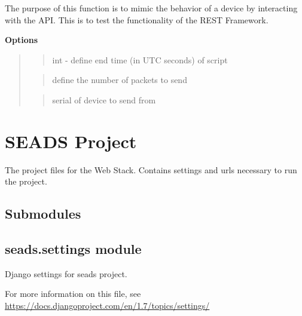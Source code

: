 \documentclass[letterpaper,10pt,english]{sphinxmanual}
\begin{document}

\begin{fulllineitems}
\label{modules/pseudodevice:pseudodevice.main}
The purpose of this function is to mimic the behavior of a device
by interacting with the API. This is to test the functionality
of the REST Framework.

\textbf{Options}
\begin{quote}

 
\begin{quote}

int - define end time (in UTC seconds) of script
\end{quote}

 
\begin{quote}

define the number of packets to send
\end{quote}

 
\begin{quote}

serial of device to send from
\end{quote}
\end{quote}

\end{fulllineitems}



\section{SEADS Project}
\label{modules/seads:seads-project}\label{modules/seads::doc}
The project files for the Web Stack. Contains settings and urls
necessary to run the project.


\subsection{Submodules}
\label{modules/seads:submodules}

\subsection{seads.settings module}
\label{modules/seads:seads-settings-module}\label{modules/seads:module-seads.settings}
Django settings for seads project.

For more information on this file, see
\href{https://docs.djangoproject.com/en/1.7/topics/settings/}{https://docs.djangoproject.com/en/1.7/topics/settings/}
\end{document}
